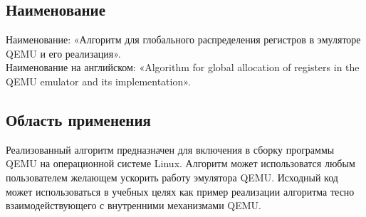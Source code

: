 \subsection{Наименование}
Наименование: «Алгоритм для глобального распределения регистров в эмуляторе QEMU и его реализация». \\
Наименование на английском: «Algorithm for global allocation of registers in the QEMU emulator and its implementation». \\

\subsection{Область применения}
Реализованный алгоритм предназначен для включения в сборку программы QEMU на операционной системе Linux. Алгоритм может использоватся любым пользователем желающем ускорить работу эмулятора QEMU. Исходный код может использоваться в учебных целях как пример реализации алгоритма тесно взаимодействующего с внутренними механизмами QEMU.

